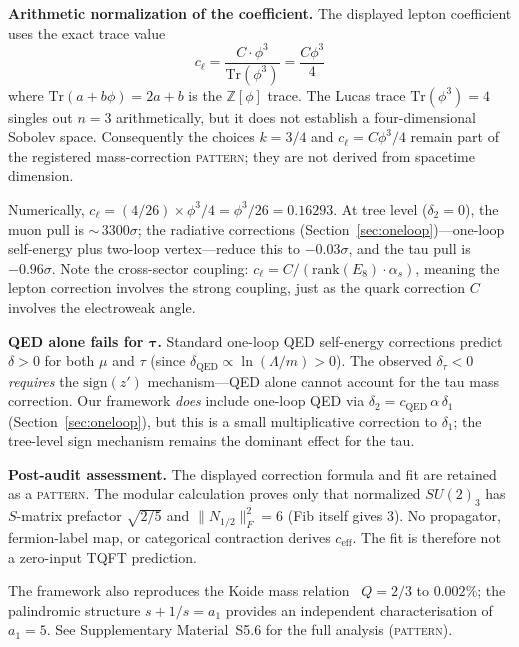 \documentclass[12pt,a4paper]{article}
\theoremstyle{definition}
\begin{document}
\textbf{Arithmetic normalization of the coefficient.} The displayed lepton coefficient uses the exact trace value
\begin{equation}
\boxed{c_\ell = \frac{C \cdot \phi^3}{\mathrm{Tr}(\phi^3)} = \frac{C \phi^3}{4}}
\label{eq:cell}
\end{equation}
where $\mathrm{Tr}(a+b\phi)=2a+b$ is the $\mathbb Z[\phi]$ trace.  The Lucas trace $\mathrm{Tr}(\phi^3)=4$ singles out $n=3$ arithmetically, but it does not establish a four-dimensional Sobolev space.  Consequently the choices $k=3/4$ and $c_\ell=C\phi^3/4$ remain part of the registered mass-correction \textsc{pattern}; they are not derived from spacetime dimension.

Numerically, $c_\ell = (4/26) \times \phi^3 / 4 = \phi^3/26 = 0.16293$.  At tree level ($\delta_2 = 0$), the muon pull is ${\sim}\,3300\sigma$; the radiative corrections (Section~\ref{sec:oneloop})---one-loop self-energy plus two-loop vertex---reduce this to $-0.03\sigma$, and the tau pull is $-0.96\sigma$.  Note the cross-sector coupling: $c_\ell = C/(\mathrm{rank}(E_8) \cdot \alpha_s)$, meaning the lepton correction involves the strong coupling, just as the quark correction $C$ involves the electroweak angle.

\textbf{QED alone fails for $\boldsymbol{\tau}$.} Standard one-loop QED self-energy corrections predict $\delta > 0$ for both $\mu$ and $\tau$ (since $\delta_{\text{QED}} \propto \ln(\Lambda/m) > 0$). The observed $\delta_\tau < 0$ \emph{requires} the $\mathrm{sign}(z')$ mechanism---QED alone cannot account for the tau mass correction.  Our framework \emph{does} include one-loop QED via $\delta_2 = c_{\text{QED}}\,\alpha\,\delta_1$ (Section~\ref{sec:oneloop}), but this is a small multiplicative correction to $\delta_1$; the tree-level sign mechanism remains the dominant effect for the tau.

\textbf{Post-audit assessment.}  The displayed correction formula and fit are retained as a \textsc{pattern}.  The modular calculation proves only that normalized \(SU(2)_3\) has \(S\)-matrix prefactor \(\sqrt{2/5}\) and \(\|N_{1/2}\|_F^2=6\) (Fib itself gives \(3\)).  No propagator, fermion-label map, or categorical contraction derives \(c_{\mathrm{eff}}\).  The fit is therefore not a zero-input TQFT prediction.

The framework also reproduces the Koide mass relation~\cite{Koide1983} $Q = 2/3$ to $0.002\%$; the palindromic structure $s + 1/s = a_1$ provides an independent characterisation of $a_1 = 5$.  See Supplementary Material~S5.6 for the full analysis (\textsc{pattern}).
\end{document}
